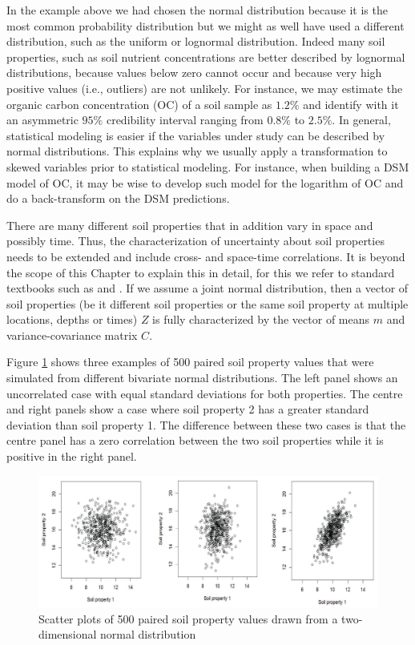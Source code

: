 \documentclass[10pt,b5paper,]{book}
\theoremstyle{definition}
\theoremstyle{definition}
\theoremstyle{definition}
\theoremstyle{remark}
\begin{document}
In the example above we had chosen the normal distribution because it is
the most common probability distribution but we might as well have used
a different distribution, such as the uniform or lognormal distribution.
Indeed many soil properties, such as soil nutrient concentrations are
better described by lognormal distributions, because values below zero
cannot occur and because very high positive values (i.e., outliers) are
not unlikely. For instance, we may estimate the organic carbon
concentration (OC) of a soil sample as \(1.2\%\) and identify with it an
asymmetric \(95\%\) credibility interval ranging from \(0.8\%\) to
\(2.5\%\). In general, statistical modeling is easier if the variables
under study can be described by normal distributions. This explains why
we usually apply a transformation to skewed variables prior to
statistical modeling. For instance, when building a DSM model of OC, it
may be wise to develop such model for the logarithm of OC and do a
back-transform on the DSM predictions.

There are many different soil properties that in addition vary in space
and possibly time. Thus, the characterization of uncertainty about soil
properties needs to be extended and include cross- and space-time
correlations. It is beyond the scope of this Chapter to explain this in
detail, for this we refer to standard textbooks such as
\citet{goovaerts1997geostatistics} and \citet{webster_2007}. If we
assume a joint normal distribution, then a vector of soil properties (be
it different soil properties or the same soil property at multiple
locations, depths or times) \(Z\) is fully characterized by the vector
of means \(m\) and variance-covariance matrix \(C\).

Figure \ref{fig:pairedsoils} shows three examples of 500 paired soil
property values that were simulated from different bivariate normal
distributions. The left panel shows an uncorrelated case with equal
standard deviations for both properties. The centre and right panels
show a case where soil property 2 has a greater standard deviation than
soil property 1. The difference between these two cases is that the
centre panel has a zero correlation between the two soil properties
while it is positive in the right panel.

\begin{figure}

{\centering \includegraphics[width=0.8\linewidth]{images/pairedsoilpropierties} 

}

\caption{Scatter plots of 500 paired soil property values drawn from a two-dimensional normal distribution}\label{fig:pairedsoils}
\end{figure}
\end{document}
